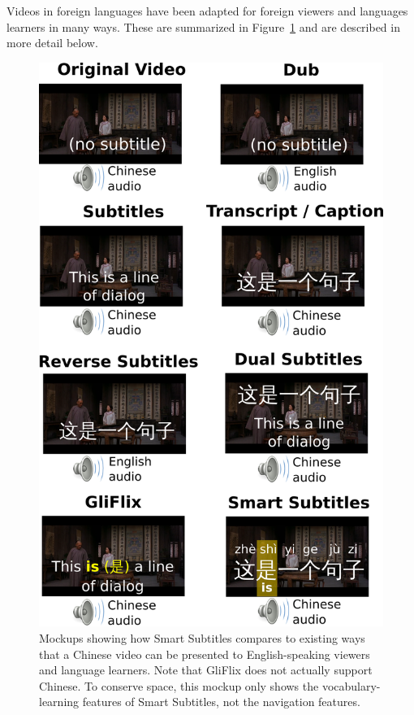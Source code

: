 \documentclass{sigchi}
\begin{document}
Videos in foreign languages have been adapted for foreign viewers and languages learners in many ways. These are summarized in Figure~\ref{fig:figure2} and are described in more detail below.

\begin{figure}[!h]
\centering
\includegraphics[width=\columnwidth]{subtitle-types-2column}
\caption{Mockups showing how Smart Subtitles
compares to existing ways that a Chinese video can be presented
to English-speaking viewers and language learners.
Note that GliFlix does not actually support Chinese.
To conserve space, this mockup only shows the vocabulary-learning features of Smart Subtitles, not the navigation features.}
\label{fig:figure2}
\end{figure}
\end{document}
